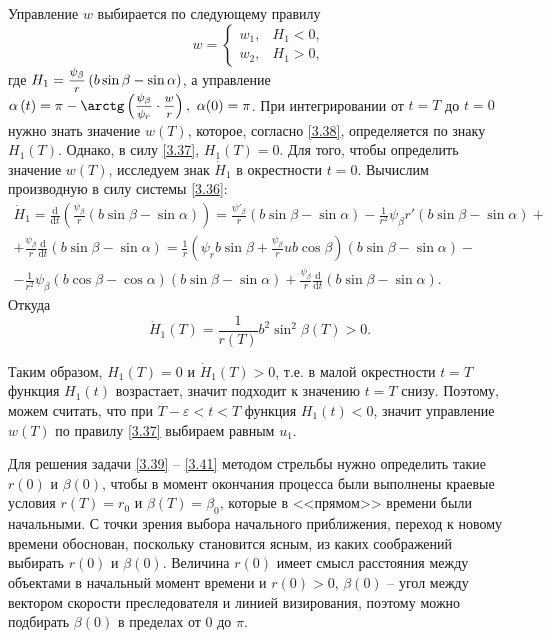 \documentclass[a4paper,12pt, openany]{book}
\theoremstyle{plain} %
\theoremstyle{definition} %
\theoremstyle{remark} %
\newcommand{\dd}{\mathrm{d}}
\numberwithin{equation}{chapter}
\begin{document}
{\begin{equation}
\end{equation}
Управление $w$ выбирается по следующему правилу
\begin{equation}\label{3.41}
w = 
\begin{cases}
w_1, & H_1 < 0, \\
w_2, & H_1 > 0, 
\end{cases}
\end{equation}
где $H_1  = \mfrac{{\psi _\beta  }}
{r}\left( {b\sin \beta  - \sin \alpha } \right)$, а управление $\alpha \left( t \right) = \pi - \arctg\left( {\mfrac{{\psi _\beta  }}
{{\psi _r }} \cdot \mfrac{w}
{r}} \right), \,\, \alpha(0) = \pi$.
\newpage
При интегрировании от $t = T$ до $t =0$ нужно знать значение $w(T)$, которое, согласно \eqref{3.38}, определяется по знаку $H_1(T)$. Однако, в силу \eqref{3.37}, $H_1(T) = 0$. Для того, чтобы определить значение $w(T)$, исследуем знак $\dot H_1$ в окрестности $t= 0$. Вычислим производную в силу системы \eqref{3.36}:
\begin{multline*}
\dot H_1  = \frac{\dd}
{{\dd t }}\left( {\frac{{\psi _\beta  }}
{r}\left( {b\sin \beta  - \sin \alpha } \right)} \right) = \frac{{\psi '_\beta  }}
{r}\left( {b\sin \beta  - \sin \alpha } \right) - \frac{1}
{{r^2 }}\psi _\beta  r'\left( {b\sin \beta  - \sin \alpha } \right) + \\
 + \frac{{\psi _\beta  }}
{r}\frac{\dd}
{{\dd t }}\left( {b\sin \beta  - \sin \alpha } \right) = \frac{1}
{r}\left( {\psi _r b\sin \beta  + \frac{{\psi _\beta  }}
{r}ub\cos \beta } \right)\left( {b\sin \beta  - \sin \alpha } \right) - \\
 - \frac{1}
{{r^2 }}\psi _\beta  \left( {b\cos \beta  - \cos \alpha } \right)\left( {b\sin \beta  - \sin \alpha } \right) + \frac{{\psi _\beta  }}
{r}\frac{\dd}
{{\dd t }}\left( {b\sin \beta  - \sin \alpha } \right).
\end{multline*}
Откуда
\[
\dot H_1 \left( T \right) = \frac{1}
{{r\left( T \right)}}b^2 \sin ^2 \beta \left( T \right) > 0.
\]

Таким образом, $H_1(T) = 0$ и $\dot H_1(T) > 0$, т.е. в малой окрестности $t=T$ функция $H_1(t)$ возрастает, значит подходит к значению $t=T$ снизу. Поэтому, можем считать, что при $T-\varepsilon < t< T$ функция $H_1(t) < 0$, значит управление $w(T)$ по правилу \eqref{3.37} выбираем равным $u_1$. 



Для решения задачи \eqref{3.39} -- \eqref{3.41} методом стрельбы нужно определить такие $r(0)$ и $\beta(0)$, чтобы в момент окончания процесса были выполнены краевые условия $r(T) = r_0$ и $\beta(T) = \beta_0$, которые в <<прямом>> времени были начальными. С точки зрения выбора начального приближения, переход к новому времени обоснован, поскольку становится ясным, из каких соображений выбирать $r(0)$ и $\beta(0)$. Величина $r(0)$ имеет смысл расстояния между объектами в начальный момент времени и $r(0)>0$, $\beta(0)$ -- угол между вектором скорости преследователя и линией визирования, поэтому можно подбирать $\beta(0)$ в пределах от $0$ до $\pi$.
\newpage
}
\end{document}
